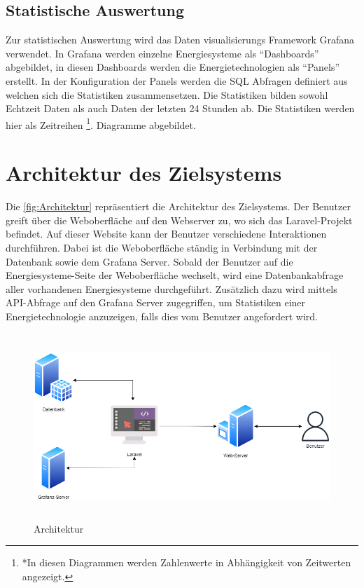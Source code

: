 \subsection{Statistische Auswertung}
Zur statistischen Auswertung wird das Daten visualisierungs Framework Grafana verwendet. In Grafana werden einzelne Energiesysteme als “Dashboards” abgebildet, in diesen Dashboards werden die Energietechnologien als “Panels” erstellt. In der Konfiguration der Panels werden die SQL Abfragen definiert aus welchen sich die Statistiken zusammensetzen. Die Statistiken bilden sowohl Echtzeit Daten als auch Daten der letzten 24 Stunden ab. Die Statistiken werden hier als Zeitreihen \footnote{ *In diesen Diagrammen werden Zahlenwerte in Abhängigkeit von Zeitwerten angezeigt.	
 }. Diagramme abgebildet.


\newpage
\section{Architektur des Zielsystems}
Die \autoref{fig:Architektur} repräsentiert die Architektur des Zielsystems. Der Benutzer greift über die Weboberfläche auf den Webserver zu, wo sich das Laravel-Projekt befindet. Auf dieser Website kann der Benutzer verschiedene Interaktionen durchführen. Dabei ist die Weboberfläche ständig in Verbindung mit der Datenbank sowie dem Grafana Server. Sobald der Benutzer auf die Energiesysteme-Seite der Weboberfläche wechselt, wird eine Datenbankabfrage aller vorhandenen Energiesysteme durchgeführt. Zusätzlich dazu wird mittels API-Abfrage auf den Grafana Server zugegriffen, um Statistiken einer Energietechnologie anzuzeigen, falls dies vom Benutzer angefordert wird.

\begin{figure}[h]
	\centering
	\includegraphics[height=7cm,width=15cm]{images/Architektur}
	\caption{Architektur}
	\label{fig:Architektur}
\end{figure}

